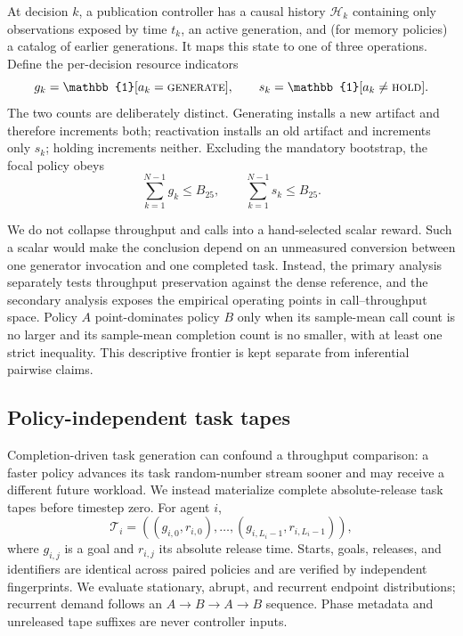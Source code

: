 \documentclass[sigconf,review,anonymous]{acmart}
\begin{document}
At decision $k$, a publication controller has a causal history
$\mathcal{H}_k$ containing only observations exposed by time $t_k$, an active
generation, and (for memory policies) a catalog of earlier generations. It
maps this state to one of three operations. Define the per-decision resource
indicators
\begin{equation}
 g_k=\mathbb{1}[a_k=\textsc{generate}],\qquad
 s_k=\mathbb{1}[a_k\neq\textsc{hold}].
\end{equation}
The two counts are deliberately distinct. Generating installs a new artifact
and therefore increments both; reactivation installs an old artifact and
increments only $s_k$; holding increments neither. Excluding the mandatory
bootstrap, the focal policy obeys
\begin{equation}
 \sum_{k=1}^{N-1}g_k\leq B_{25},\qquad
 \sum_{k=1}^{N-1}s_k\leq B_{25}.
\end{equation}

We do not collapse throughput and calls into a hand-selected scalar reward.
Such a scalar would make the conclusion depend on an unmeasured conversion
between one generator invocation and one completed task. Instead, the primary
analysis separately tests throughput preservation against the dense reference,
and the secondary analysis exposes the empirical operating points in
call--throughput space. Policy $A$ point-dominates policy $B$ only when its
sample-mean call count is no larger and its sample-mean completion count is no
smaller, with at least one strict inequality. This descriptive frontier is
kept separate from inferential pairwise claims.

\subsection{Policy-independent task tapes}

Completion-driven task generation can confound a throughput comparison: a
faster policy advances its task random-number stream sooner and may receive a
different future workload. We instead materialize complete absolute-release
task tapes before timestep zero. For agent $i$,
\begin{equation}
  \mathcal{T}_i=((g_{i,0},r_{i,0}),\ldots,(g_{i,L_i-1},r_{i,L_i-1})),
\end{equation}
where $g_{i,j}$ is a goal and $r_{i,j}$ its absolute release time. Starts,
goals, releases, and identifiers are identical across paired policies and are
verified by independent fingerprints. We evaluate stationary, abrupt, and
recurrent endpoint distributions; recurrent demand follows an
$A\!\rightarrow\!B\!\rightarrow\!A\!\rightarrow\!B$ sequence. Phase metadata
and unreleased tape suffixes are never controller inputs.
\end{document}
